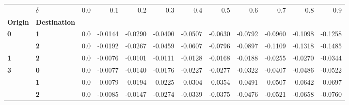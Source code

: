 \begin{tabular}{llrrrrrrrrrr}
\toprule
    & \textbf{\(\delta\)} &  0.0 &     0.1 &     0.2 &     0.3 &     0.4 &     0.5 &     0.6 &     0.7 &     0.8 &     0.9 \\
\textbf{Origin} & \textbf{Destination} &      &         &         &         &         &         &         &         &         &         \\
\midrule
\textbf{0} & \textbf{1} &  0.0 & -0.0144 & -0.0290 & -0.0400 & -0.0507 & -0.0630 & -0.0792 & -0.0960 & -0.1098 & -0.1258 \\
  & \textbf{2} &  0.0 & -0.0192 & -0.0267 & -0.0459 & -0.0607 & -0.0796 & -0.0897 & -0.1109 & -0.1318 & -0.1485 \\
\textbf{1} & \textbf{2} &  0.0 & -0.0076 & -0.0101 & -0.0111 & -0.0128 & -0.0168 & -0.0188 & -0.0255 & -0.0270 & -0.0344 \\
\textbf{3} & \textbf{0} &  0.0 & -0.0077 & -0.0140 & -0.0176 & -0.0227 & -0.0277 & -0.0322 & -0.0407 & -0.0486 & -0.0522 \\
  & \textbf{1} &  0.0 & -0.0079 & -0.0194 & -0.0225 & -0.0304 & -0.0354 & -0.0491 & -0.0507 & -0.0642 & -0.0697 \\
  & \textbf{2} &  0.0 & -0.0085 & -0.0147 & -0.0274 & -0.0339 & -0.0375 & -0.0476 & -0.0521 & -0.0658 & -0.0760 \\
\bottomrule
\end{tabular}
